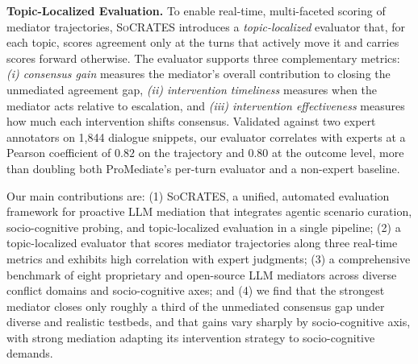 \documentclass{llmxive}
\providecommand{\algname}{\textsc{SoCRATES}}
\begin{document}
\smallskip\smallskip
\noindent\textbf{Topic-Localized Evaluation.} To enable real-time, multi-faceted scoring of mediator trajectories, \algname{} introduces a \emph{topic-localized} evaluator that, for each topic, scores agreement only at the turns that actively move it and carries scores forward otherwise. The evaluator supports three complementary metrics: \emph{(i) consensus gain} measures the mediator's overall contribution to closing the unmediated agreement gap, \emph{(ii) intervention timeliness} measures when the mediator acts relative to escalation, and \emph{(iii) intervention effectiveness} measures how much each intervention shifts consensus. Validated against two expert annotators on 1,844 dialogue snippets, our evaluator correlates with experts at a Pearson coefficient of $0.82$ on the trajectory and $0.80$ at the outcome level, more than doubling both ProMediate's per-turn evaluator \citep{liu2025promediate} and a non-expert baseline.

Our main contributions are: (1) \algname{}, a unified, automated evaluation framework for proactive LLM mediation that integrates agentic scenario curation, socio-cognitive probing, and topic-localized evaluation in a single pipeline; (2) a topic-localized evaluator that scores mediator trajectories along three real-time metrics and exhibits high correlation with expert judgments; (3) a comprehensive benchmark of eight proprietary and open-source LLM mediators across diverse conflict domains and socio-cognitive axes; and (4)  we find that the strongest mediator closes only roughly a third of the unmediated consensus gap under diverse and realistic testbeds, and that gains vary sharply by socio-cognitive axis, with strong mediation adapting its intervention strategy to socio-cognitive demands.







\end{document}
